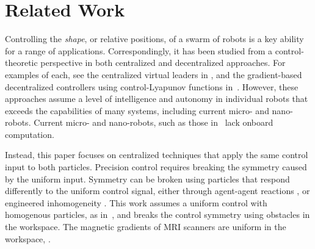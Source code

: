 
\section{Related Work}\label{sec:RelatedWork}

Controlling the \emph{shape}, or relative positions, of a swarm of robots is a key ability for a range of applications.  Correspondingly, it has been studied from a control-theoretic perspective in  both centralized and decentralized approaches. For examples of each, see the centralized virtual leaders in \cite{egerstedt2001formation}, and the  gradient-based decentralized controllers  using control-Lyapunov functions in~\cite{hsieh2008decentralized}. However, these approaches assume a level of intelligence and autonomy in individual robots that exceeds the capabilities of many systems, including current micro- and nano-robots.  Current micro- and nano-robots, such as those in~\cite{Chowdhury2015,martel2015magnetotactic,Xiaohui2015magnetiteMicroswimmers} lack onboard computation.

Instead, this paper focuses on centralized techniques that apply the same control input to both particles. 
Precision control requires breaking the symmetry caused by the uniform input.  
Symmetry can be broken using particles that respond differently to the uniform control signal, either through agent-agent reactions \cite{bertozzi2015ring}, or engineered inhomogeneity  \cite{Donald2013,bretl2007,beckerIJRR2014}. 
This work assumes a uniform control with homogenous particles, as in~\cite{Becker2013b}, and breaks the control symmetry using obstacles in the workspace. The magnetic gradients of MRI scanners are uniform in the workspace, \cite{nosrati2018development}.



